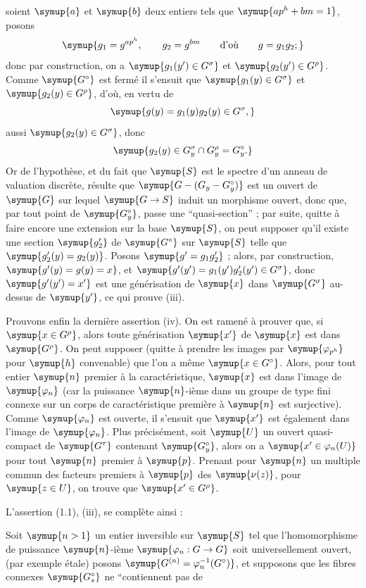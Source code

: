 soient $\symup{a}$ et $\symup{b}$ deux entiers tels que $\symup{ap^h+bm=1}$, posons
\[
\symup{g_1=g^{ap^h},\qquad g_2=g^{bm}\qquad\text{d'où}\qquad g=g_1g_2 ;}
\]
donc par construction, on a $\symup{g_1(y')\in G^\sigma}$ et
$\symup{g_2(y')\in G^\rho}$. Comme $\symup{G^\circ}$ est fermé il s'ensuit que
$\symup{g_1(y)\in G^\sigma}$ et $\symup{g_2(y)\in G^\rho}$, d'où, en vertu de
\[
\symup{g(y)=g_1(y)g_2(y)\in G^\sigma,}
\]
aussi $\symup{g_2(y)\in G^\sigma}$, donc
\[
\symup{g_2(y)\in G_y^\sigma\cap G_y^\rho=G_y^\circ.}
\]
Or de l'hypothèse, et du fait que $\symup{S}$ est le spectre d'un anneau de valuation
discrète, résulte que $\symup{G-(G_y-G_y^\circ)}$ est un ouvert de $\symup{G}$ sur lequel
$\symup{G\to  S}$ induit un morphisme ouvert, donc que, par tout point de
$\symup{G_y^\circ}$, passe une ``quasi-section'' ; par suite, quitte à faire encore une
extension sur la base $\symup{S}$, on peut supposer qu'il existe une section $\symup{g'_2}$ de
$\symup{G^\circ}$ sur $\symup{S}$ telle que $\symup{g'_2(y)=g_2(y)}$. Posons $\symup{g'=g_1g'_2}$ ; alors, par
construction, $\symup{g'(y)=g(y)=x}$, et
$\symup{g'(y')=g_1(y')g'_2(y')\in G^\sigma}$, donc $\symup{g'(y')=x'}$ est une générisation de $\symup{x}$ dans $\symup{G^\sigma}$ au-dessus de
$\symup{y'}$, ce qui prouve (iii).

Prouvons enfin la dernière assertion (iv). On est ramené à prouver que, si
$\symup{x\in G^\rho}$, alors toute générisation $\symup{x'}$ de $\symup{x}$ est dans $\symup{G^\rho}$. On peut
supposer (quitte à prendre les images par $\symup{\varphi_{p^h}}$ pour $\symup{h}$
convenable) que l'on a même
$\symup{x\in G^\circ}$. Alors, pour tout entier $\symup{n}$ premier à la caractéristique, $\symup{x}$
est dans l'image de $\symup{\varphi_n}$ (car la puissance $\symup{n}$-ième dans un groupe de
type fini connexe sur un corps de caractéristique première à $\symup{n}$ est
surjective). Comme $\symup{\varphi_n}$ est ouverte, il s'ensuit que $\symup{x'}$ est également
dans l'image de $\symup{\varphi_n}$. Plus précisément, soit $\symup{U}$ un ouvert
quasi-compact de $\symup{G^\tau}$ contenant $\symup{G_y^\circ}$, alors on a
$\symup{x'\in\varphi_n(U)}$ pour tout $\symup{n}$ premier à $\symup{p}$. Prenant pour $\symup{n}$ un multiple
commun des facteurs premiers à $\symup{p}$ des $\symup{\nu(z)}$, pour $\symup{z\in U}$, on trouve que
$\symup{x'\in G^\rho}$.

L'assertion (1.1), (iii), se complète ainsi :

 Soit $\symup{n>1}$ un entier inversible sur $\symup{S}$ tel que l'homomorphisme de
puissance $\symup{n}$-ième $\symup{\varphi_n:G\to  G}$ soit universellement ouvert,
(par exemple étale) posons
$\symup{G^{(n)}=\varphi_n^{-1}(G^\circ)}$, et supposons que les fibres connexes $\symup{G_s^\circ}$ ne ``contiennent pas de

